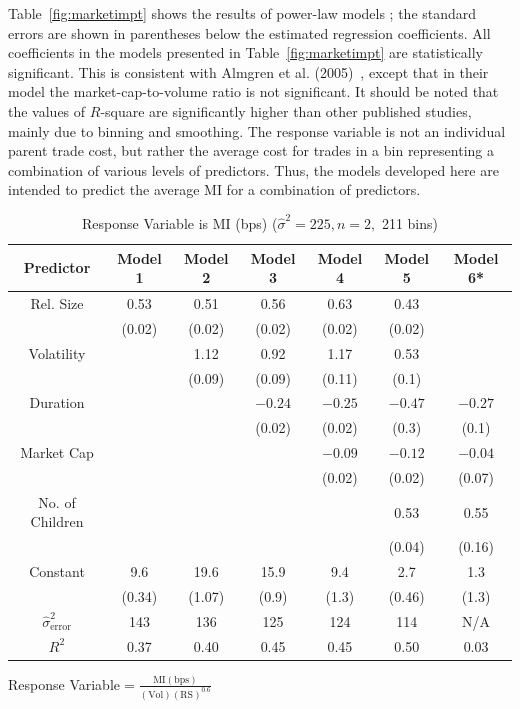 Table~\ref{fig:marketimpt} shows the results of power-law models ; the standard errors are shown in parentheses below the estimated regression coefficients. All coefficients in the models presented in Table~\ref{fig:marketimpt} are statistically significant. This is consistent with Almgren et al. (2005)~\cite{athl}, except that in their model the market-cap-to-volume ratio is not significant. It should be noted that the values of $R$-square are significantly higher than other published studies, mainly due to binning and smoothing. The response variable is not an individual parent trade cost, but rather the average cost for trades in a bin representing a combination of various levels of predictors. Thus, the models developed here are intended to predict the average MI for a combination of predictors.


\begin{table}[!ht]
\caption{Response Variable is MI (bps) ($\hat{\sigma}^2=225, n=2,$ 211 bins)}
\begin{tabular}{|c|c|c|c|c|c|c|}
Predictor & Model 1& Model 2 & Model 3 & Model 4 & Model 5 & Model 6* \\ \hline
Rel. Size & 0.53 & 0.51 & 0.56 & 0.63 & 0.43 & \\
	& (0.02) & (0.02) & (0.02) & (0.02) & (0.02) & \\
Volatility & & 1.12 & 0.92 & 1.17 & 0.53 & \\
	& & (0.09) & (0.09) & (0.11) & (0.1) & \\
Duration	& & & $-0.24$ & $-0.25$ & $-0.47$ & $-0.27$ \\
	& & & (0.02) & (0.02) & (0.3) & (0.1) \\
Market Cap & & & & $-0.09$ & $-0.12$ & $-0.04$ \\
	& & & & (0.02) & (0.02) & (0.07) \\
No. of Children & & & & & 0.53 & 0.55 \\
	& & & & & (0.04) & (0.16) \\
Constant & 9.6 & 19.6 & 15.9 & 9.4 & 2.7 & 1.3 \\
	& (0.34) & (1.07) & (0.9) & (1.3) & (0.46) & (1.3) \\
\hline
$\hat{\sigma}_{\text{error}}^2$ & 143 & 136 & 125 & 124 & 114 & N/A \\
$R^2$ & 0.37 & 0.40 & 0.45 & 0.45 & 0.50 & 0.03 \\
\end{tabular}
\small*Response Variable$ = \frac{\text{MI}(\text{bps})}{(\text{Vol})(\text{RS})^0.6}$\normalsize
\end{table}


